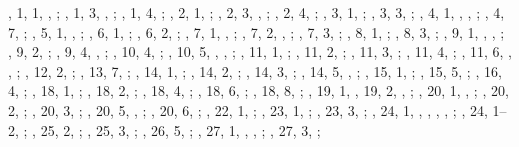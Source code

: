 \begin{autindex}
    ,  1,  1, , ;
    ,  1,  3, , ;
    ,  1,  4, ;
    ,  2,  1, ;
    ,  2,  3, , ;
    ,  2,  4, ;
    ,  3,  1, ;
    ,  3,  3, ;
    ,  4,  1, , , ;
    ,  4,  7, ;
    ,  5,  1, , ;
    ,  6,  1, ;
    ,  6,  2, ;
    ,  7,  1, , ;
    ,  7,  2, , ;
    ,  7,  3, ;
    ,  8,  1, ;
    ,  8,  3, ;
    ,  9,  1, , , ;
    ,  9,  2, ;
    ,  9,  4, , ;
    , 10,  4, ;
    , 10,  5, , , ;
    , 11,  1, ;
    , 11,  2, ;
    , 11,  3, ;
    , 11,  4, ;
    , 11,  6, , , ;
    , 12,  2, ;
    , 13,  7, ;
    , 14,  1, ;
    , 14,  2, ;
    , 14,  3, ;
    , 14,  5, , ;
    , 15,  1, ;
    , 15,  5, ;
    , 16,  4, ;
    , 18,  1, ;
    , 18,  2, ;
    , 18,  4, ;
    , 18,  6, ;
    , 18,  8, ;
    , 19,  1, 
    , 19,  2, , ;
    , 20,  1, , ;
    , 20,  2, ;
    , 20,  3, ;
    , 20,  5, , ;
    , 20,  6, ;
    , 22,  1, ;
    , 23,  1, ;
    , 23,  3, ;
    , 24,  1, , , ,
                           , ;
    , 24,  1–2, ;
    , 25,  2, ;
    , 25,  3, ;
    , 26,  5, ;
    , 27,  1, , , ;
    , 27,  3, ;

\end{autindex}
